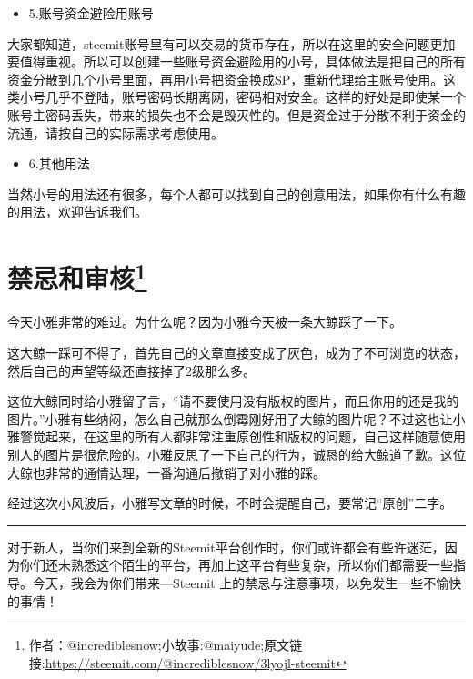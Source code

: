 \documentclass[]{ctexbook}
\providecommand{\tightlist}{%
  \setlength{\itemsep}{0pt}\setlength{\parskip}{0pt}}
\begin{document}
\begin{itemize}
\tightlist
\item
  5.账号资金避险用账号
\end{itemize}

大家都知道，steemit账号里有可以交易的货币存在，所以在这里的安全问题更加要值得重视。所以可以创建一些账号资金避险用的小号，具体做法是把自己的所有资金分散到几个小号里面，再用小号把资金换成SP，重新代理给主账号使用。这类小号几乎不登陆，账号密码长期离网，密码相对安全。这样的好处是即使某一个账号主密码丢失，带来的损失也不会是毁灭性的。但是资金过于分散不利于资金的流通，请按自己的实际需求考虑使用。

\begin{itemize}
\tightlist
\item
  6.其他用法
\end{itemize}

当然小号的用法还有很多，每个人都可以找到自己的创意用法，如果你有什么有趣的用法，欢迎告诉我们。

\section[禁忌和审核]{\texorpdfstring{禁忌和审核\footnote{作者：@incrediblesnow;小故事:@maiyude;原文链接:\url{https://steemit.com/@incrediblesnow/3lyojl-steemit}}}{禁忌和审核}}

今天小雅非常的难过。为什么呢？因为小雅今天被一条大鲸踩了一下。

这大鲸一踩可不得了，首先自己的文章直接变成了灰色，成为了不可浏览的状态，然后自己的声望等级还直接掉了2级那么多。

这位大鲸同时给小雅留了言，``请不要使用没有版权的图片，而且你用的还是我的图片。''小雅有些纳闷，怎么自己就那么倒霉刚好用了大鲸的图片呢？不过这也让小雅警觉起来，在这里的所有人都非常注重原创性和版权的问题，自己这样随意使用别人的图片是很危险的。小雅反思了一下自己的行为，诚恳的给大鲸道了歉。这位大鲸也非常的通情达理，一番沟通后撤销了对小雅的踩。

经过这次小风波后，小雅写文章的时候，不时会提醒自己，要常记``原创''二字。

\begin{center}\rule{0.5\linewidth}{\linethickness}\end{center}

对于新人，当你们来到全新的Steemit平台创作时，你们或许都会有些许迷茫，因为你们还未熟悉这个陌生的平台，再加上这平台有些复杂，所以你们都需要一些指导。今天，我会为你们带来---Steemit 上的禁忌与注意事项，以免发生一些不愉快的事情！
\end{document}
